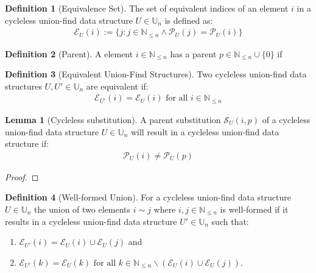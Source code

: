 \documentclass[a4paper,12pt]{article}
\theoremstyle{definition}
\newtheorem{definition}{Definition}[section]
\newtheorem{lemma}{Lemma}[section]
\begin{document}
\begin{definition}[Equivalence Set]
    The set of equivalent indices of an element $i$ in a cycleless union-find
    data structure $U \in \mathbb{U}_n$ is defined as:
    \begin{align*}
        \mathcal{E}_U(i) := \{j : j \in \mathbb{N}_{\leq n} \land \mathcal{P}_U(j) = \mathcal{P}_U(i)\}
    \end{align*}
\end{definition}

\begin{definition}[Parent]
    A element $i \in \mathbb{N}_{\leq n}$ has a parent $p \in \mathbb{N}_{\leq n} 
    \cup \{0\}$ if 
\end{definition}

\begin{definition}[Equivalent Union-Find Structures]
    Two cycleless union-find data structures $U, U' \in \mathbb{U}_n$ are
    equivalent if:
    \begin{align*}
        \mathcal{E}_{U'}(i) = \mathcal{E}_U(i) \text{ for all } i \in \mathbb{N}_{\leq n}
    \end{align*}
\end{definition}
\begin{lemma}[Cycleless substitution]
    A parent substitution $\mathcal{S}_U(i, p)$ of a cycleless union-find
    data structure $U \in \mathbb{U}_n$ will result in a cycleless union-find
    data structure if:
    \begin{align*}
        \mathcal{P}_U(i) \neq \mathcal{P}_U(p)
    \end{align*} 
\end{lemma}
\begin{proof}
    
\end{proof}

\begin{definition}[Well-formed Union]
    For a cycleless union-find data structure $U \in \mathbb{U}_n$ the union of
    two elements $i \sim j$ where $i, j \in \mathbb{N}_{\leq n}$ is well-formed
    if it results in a cycleless union-find data structure $U' \in \mathbb{U}_n$
    such that:
    \begin{enumerate}
        \item $\mathcal{E}_{U'}(i) = \mathcal{E}_U(i) \cup \mathcal{E}_U(j)$ and
        \item $\mathcal{E}_{U'}(k) = \mathcal{E}_U(k) \text{ for all } k \in
        \mathbb{N}_{\leq n} \backslash (\mathcal{E}_U(i) \cup \mathcal{E}_U(j))$.
    \end{enumerate}
\end{definition}
\end{document}
